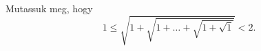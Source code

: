    Mutassuk meg, hogy
   \begin{equation*}
   1 \le \sqrt{1 + \sqrt{ 1 + \hdots + \sqrt{ 1 + \sqrt{ 1 } } }} < 2.
   \end{equation*}
